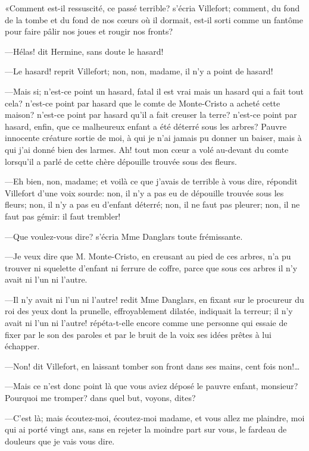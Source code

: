 «Comment est-il ressuscité, ce passé terrible? s'écria Villefort; comment, du fond de la tombe et du fond de nos cœurs où il dormait, est-il sorti comme un fantôme pour faire pâlir nos joues et rougir nos fronts? 

—Hélas! dit Hermine, sans doute le hasard! 

—Le hasard! reprit Villefort; non, non, madame, il n'y a point de hasard! 

—Mais si; n'est-ce point un hasard, fatal il est vrai mais un hasard qui a fait tout cela? n'est-ce point par hasard que le comte de Monte-Cristo a acheté cette maison? n'est-ce point par hasard qu'il a fait creuser la terre? n'est-ce point par hasard, enfin, que ce malheureux enfant a été déterré sous les arbres? Pauvre innocente créature sortie de moi, à qui je n'ai jamais pu donner un baiser, mais à qui j'ai donné bien des larmes. Ah! tout mon cœur a volé au-devant du comte lorsqu'il a parlé de cette chère dépouille trouvée sous des fleurs. 

—Eh bien, non, madame; et voilà ce que j'avais de terrible à vous dire, répondit Villefort d'une voix sourde: non, il n'y a pas eu de dépouille trouvée sous les fleurs; non, il n'y a pas eu d'enfant déterré; non, il ne faut pas pleurer; non, il ne faut pas gémir: il faut trembler! 

—Que voulez-vous dire? s'écria Mme Danglars toute frémissante. 

—Je veux dire que M. Monte-Cristo, en creusant au pied de ces arbres, n'a pu trouver ni squelette d'enfant ni ferrure de coffre, parce que sous ces arbres il n'y avait ni l'un ni l'autre. 

—Il n'y avait ni l'un ni l'autre! redit Mme Danglars, en fixant sur le procureur du roi des yeux dont la prunelle, effroyablement dilatée, indiquait la terreur; il n'y avait ni l'un ni l'autre! répéta-t-elle encore comme une personne qui essaie de fixer par le son des paroles et par le bruit de la voix ses idées prêtes à lui échapper. 

—Non! dit Villefort, en laissant tomber son front dans ses mains, cent fois non!\dots 

—Mais ce n'est donc point là que vous aviez déposé le pauvre enfant, monsieur? Pourquoi me tromper? dans quel but, voyons, dites? 

—C'est là; mais écoutez-moi, écoutez-moi madame, et vous allez me plaindre, moi qui ai porté vingt ans, sans en rejeter la moindre part sur vous, le fardeau de douleurs que je vais vous dire. 

